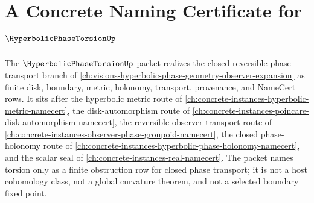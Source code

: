 \chapter{A Concrete Naming Certificate for $\HyperbolicPhaseTorsionUp$}
\label{ch:concrete-instances-hyperbolic-phase-torsion-namecert}

The $\HyperbolicPhaseTorsionUp$ packet realizes the closed reversible phase-transport branch of \autoref{ch:visions-hyperbolic-phase-geometry-observer-expansion} as finite disk, boundary, metric, holonomy, transport, provenance, and NameCert rows. It sits after the hyperbolic metric route of \autoref{ch:concrete-instances-hyperbolic-metric-namecert}, the disk-automorphism route of \autoref{ch:concrete-instances-poincare-disk-automorphism-namecert}, the reversible observer-transport route of \autoref{ch:concrete-instances-observer-phase-groupoid-namecert}, the closed phase-holonomy route of \autoref{ch:concrete-instances-hyperbolic-phase-holonomy-namecert}, and the scalar seal of \autoref{ch:concrete-instances-real-namecert}. The packet names torsion only as a finite obstruction row for closed phase transport; it is not a host cohomology class, not a global curvature theorem, and not a selected boundary fixed point.

